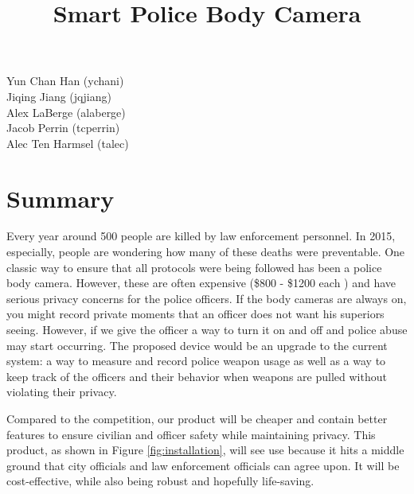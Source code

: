 \documentclass[12pt]{article}
\begin{document}
\title{Smart Police Body Camera}
\date{}
\maketitle

\vfill

\begin{center}
    Yun Chan Han (ychani)\\
    Jiqing Jiang (jqjiang)\\
    Alex LaBerge (alaberge)\\
    Jacob Perrin (tcperrin)\\
    Alec Ten Harmsel (talec)\\
\end{center}

\newpage

\tableofcontents

\newpage

\section{Summary}
Every year around 500 people are killed by law enforcement personnel. In 2015,
especially, people are wondering how many of these deaths were preventable. One
classic way to ensure that all protocols were being followed has been a police
body camera. However, these are often expensive (\$800 - \$1200 each
\cite{cam}) and have serious privacy concerns for the police officers. If the
body cameras are always on, you might record private moments that an officer
does not want his superiors seeing. However, if we give the officer a way to
turn it on and off and police abuse may start occurring. The proposed device
would be an upgrade to the current system: a way to measure and record police
weapon usage as well as a way to keep track of the officers and their behavior
when weapons are pulled without violating their privacy.

Compared to the competition, our product will be cheaper and contain better
features to ensure civilian and officer safety while maintaining privacy. This
product, as shown in Figure \ref{fig:installation},  will see use because it hits a middle ground that city officials and
law enforcement officials can agree upon. It will be cost-effective, while also
being robust and hopefully life-saving.
\end{document}
